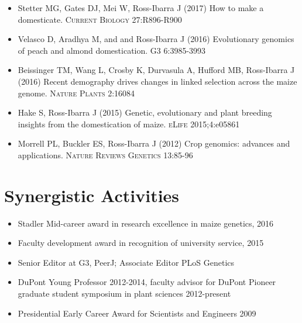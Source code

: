 \documentclass[10pt]{article}
\begin{document}
\begin{itemize} \setlength{\itemsep}{0pt} \setlength{\parskip}{2pt} \setlength{\parsep}{0pt}



  \item   { Stetter MG}, { Gates DJ}, { Mei W}, { Ross-Ibarra J} (2017) How to make a domesticate. \textsc{Current Biology} 27:R896-R900

  \item { Velasco D}, Aradhya M, and  and { Ross-Ibarra J} (2016) Evolutionary genomics of peach and almond domestication. \textsc{G3} 6:3985-3993

  \item { Beissinger TM}, Wang L, { Crosby K}, { Durvasula A}, Hufford MB, { Ross-Ibarra J} (2016)  Recent demography drives changes in linked selection across the maize genome. \textsc{Nature Plants} 2:16084

  \item Hake S, { Ross-Ibarra J} (2015) Genetic, evolutionary and plant breeding insights from the domestication of maize. \textsc{eLife}  2015;4:e05861

  \item Morrell PL, Buckler ES, { Ross-Ibarra J} (2012) Crop genomics: advances and applications.  \textsc{Nature Reviews Genetics} 13:85-96 %



\end{itemize}

\section{Synergistic Activities}

\begin{itemize} \setlength{\itemsep}{0pt} \setlength{\parskip}{2pt} \setlength{\parsep}{0pt}
\item Stadler Mid-career award in research excellence in maize genetics, 2016
\item Faculty development award in recognition of university service, 2015
\item Senior Editor at G3, PeerJ; Associate Editor PLoS Genetics
\item DuPont Young Professor 2012-2014, faculty advisor for DuPont Pioneer graduate student symposium in plant sciences 2012-present
\item Presidential Early Career Award for Scientists and Engineers 2009
\end{itemize}
\end{document}
